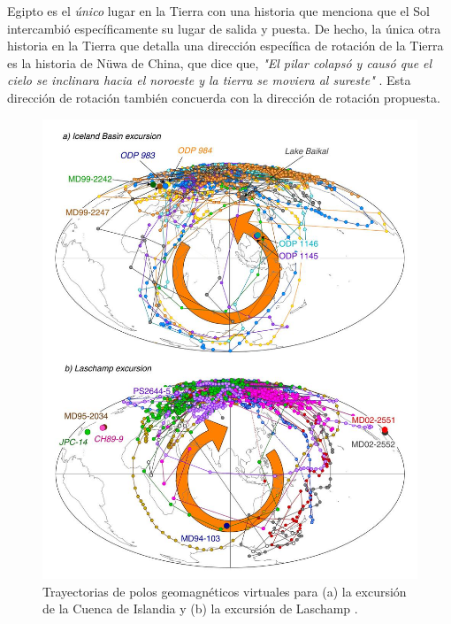 \documentclass[10pt,twocolumn,letterpaper]{article}
\begin{document}
Egipto es el \textit{único} lugar en la Tierra con una historia que menciona que el Sol intercambió específicamente su lugar de salida y puesta. De hecho, la única otra historia en la Tierra que detalla una dirección específica de rotación de la Tierra es la historia de Nüwa de China, que dice que, \textit{"El pilar colapsó y causó que el cielo se inclinara hacia el noroeste y la tierra se moviera al sureste"} \cite{8}. Esta dirección de rotación también concuerda con la dirección de rotación propuesta.

\begin{figure}[t]
\begin{center}
   \includegraphics[width=0.95\linewidth]{laj.jpg}
\end{center}
   \caption{Trayectorias de polos geomagnéticos virtuales para (a) la excursión de la Cuenca de Islandia y (b) la excursión de Laschamp \cite{35}.}
\label{fig:7}
\label{fig:onecol}
\end{figure}
\end{document}
